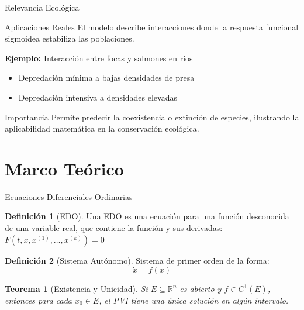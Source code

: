 \documentclass[aspectratio=169]{beamer}
\newtheorem{teo}{Teorema}[section]
\theoremstyle{definition}
\newtheorem{defi}{Definición}
\begin{document}
	\begin{frame}{Relevancia Ecológica}
		\begin{block}{Aplicaciones Reales}
			El modelo describe interacciones donde la respuesta funcional sigmoidea estabiliza las poblaciones.
		\end{block}
		
		\vspace{0.5cm}
		
		\textbf{Ejemplo:} Interacción entre focas y salmones en ríos
		\begin{itemize}
			\item Depredación mínima a bajas densidades de presa
			\item Depredación intensiva a densidades elevadas
		\end{itemize}
		
		\vspace{0.5cm}
		
		\begin{alertblock}{Importancia}
			Permite predecir la coexistencia o extinción de especies, ilustrando la aplicabilidad matemática en la conservación ecológica.
		\end{alertblock}
	\end{frame}
	
	\section{Marco Teórico}
	
	\begin{frame}{Ecuaciones Diferenciales Ordinarias}
		\begin{defi}[EDO]
			Una EDO es una ecuación para una función desconocida de una variable real, que contiene la función y sus derivadas: $F(t, x, x^{(1)}, \ldots, x^{(k)}) = 0$
		\end{defi}
		
		\vspace{0.3cm}
		
		\begin{defi}[Sistema Autónomo]
			Sistema de primer orden de la forma:
			\begin{equation}
				\dot{x} = f(x)
				\label{eq: sistema}
			\end{equation}
		\end{defi}
		
		\vspace{0.3cm}
		
		\begin{teo}[Existencia y Unicidad]
			Si $E \subseteq \mathbb{R}^n$ es abierto y $f \in C^1(E)$, entonces para cada $x_0 \in E$, el PVI tiene una única solución en algún intervalo.
		\end{teo}
	\end{frame}
	
\end{document}
